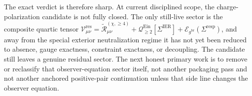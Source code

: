 \documentclass[11pt]{article}
\newcommand{\ObserverMetric}{g^{\mathrm{br}}}
\newcommand{\BaseShift}{\Sigma^{\mathrm{IER}}}
\newcommand{\ResponseShift}{\Sigma^{\mathrm{resp}}}
\newcommand{\ReLongFour}{\widetilde{\mathcal R}_{\mu\nu}^{(\chi,\ge 4)}}
\newcommand{\EinLin}{\mathcal E_{\ObserverMetric}}
\newcommand{\EinQuad}{\mathcal Q_{\ge 2}^{\mathrm{Ein}}}
\newcommand{\ResidualCore}{\mathcal V_{\mu\nu}^{\mathrm{res}}}
\begin{document}
The exact verdict is therefore sharp. At current disciplined scope, the charge-polarization candidate is not fully closed. The only still-live sector is the composite quartic tensor \(\ResidualCore=\ReLongFour+\EinQuad[\BaseShift]+\EinLin(\ResponseShift)\), and away from the special exterior neutralization regime it has not yet been reduced to absence, gauge exactness, constraint exactness, or decoupling. The candidate still leaves a genuine residual sector. The next honest primary work is to remove or reclassify that observer-equation sector itself, not another packaging pass and not another anchored positive-pair continuation unless that side line changes the observer equation.
\end{document}
